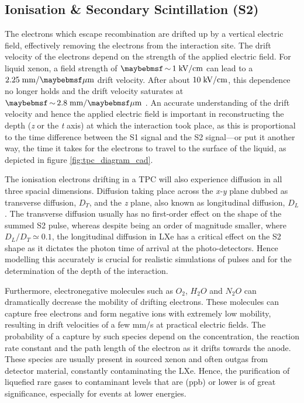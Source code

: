 \subsection{Ionisation \& Secondary Scintillation (S2)}
\label{subsec:s2}

The electrons which escape recombination are drifted up by a vertical electric field, effectively removing the electrons from the interaction site. The drift velocity of the electrons depend on the strength of the applied electric field. For liquid xenon, a field strength of $\sim 1 \; \MathText{kV/cm}$ can lead to a $2.25 \; \MathText{mm/\mu{}m}$ drift velocity. After about $10 \; \text{kV/cm}$, this dependence no longer holds and the drift velocity saturates at $\sim2.8 \; \MathText{mm/\mu{}m}$ \cite{e_drift}. An accurate understanding of the drift velocity and hence the applied electric field is important in reconstructing the depth (\textit{z} or the \textit{t} axis) at which the interaction took place, as this is proportional to the time difference between the S1 signal and the S2 signal---or put it another way, the time it takes for the electrons to travel to the surface of the liquid, as depicted in figure \ref{fig:tpc_diagram_cad}.

The ionisation electrons drifting in a TPC will also experience diffusion in all three spacial dimensions. Diffusion taking place across the \textit{x-y} plane dubbed as transverse diffusion, $D_{T}$, and the \textit{z} plane, also known as longitudinal diffusion, $D_{L}$. The transverse diffusion usually has no first-order effect on the shape of the summed S2 pulse, whereas despite being an order of magnitude smaller, where $D_{L}/D_{T} \simeq 0.1$, the longitudinal diffusion in LXe has a critical effect on the S2 shape as it dictates the photon time of arrival at the photo-detectors. Hence modelling this accurately is crucial for realistic simulations of pulses and for the determination of the depth of the interaction.

Furthermore, electronegative molecules such as $O_{2}$, $H_{2}O$ and $N_{2}O$ can dramatically decrease the mobility of drifting electrons. These molecules can capture free electrons and form negative ions with extremely low mobility, resulting in drift velocities of a few mm/s at practical electric fields. The probability of a capture by such species depend on the concentration, the reaction rate constant and the path length of the electron as it drifts towards the anode. These species are usually present in sourced xenon and often outgas from detector material, constantly contaminating the LXe. Hence, the purification of liquefied rare gases to contaminant levels that are (ppb) or lower is of great significance, especially for events at lower energies.

